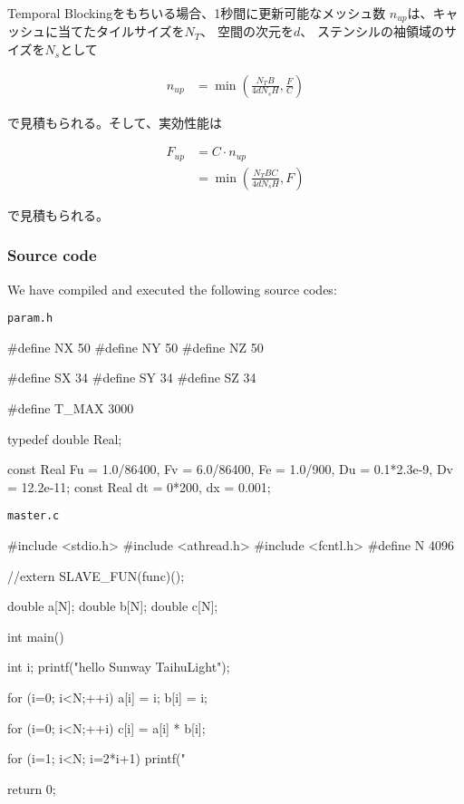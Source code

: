 Temporal Blockingをもちいる場合、1秒間に更新可能なメッシュ数
$n_{up}$は、キャッシュに当てたタイルサイズを$N_T$、
空間の次元を$d$、
ステンシルの袖領域のサイズを$N_s$として

\begin{align}
n_{up} &= \min \left( \frac{N_T B}{4dN_s H}, \frac{F}{C} \right)
\end{align}

で見積もられる。そして、実効性能は

\begin{align}
  F_{up} &= C \cdot n_{up} \\
  &= \min \left( \frac{N_T B C}{4 d N_s H}, F \right)
\end{align}

で見積もられる。




\subsubsection{Source code}
 We have compiled and executed the following source codes:

\verb`param.h`
\begin{code}
#define NX 50
#define NY 50
#define NZ 50

#define SX 34
#define SY 34
#define SZ 34

#define T_MAX 3000

typedef double Real;


const Real Fu = 1.0/86400, Fv = 6.0/86400, Fe = 1.0/900, Du = 0.1*2.3e-9, Dv = 12.2e-11;
const Real dt = 0*200, dx = 0.001;

\end{code}

\verb`master.c`
\begin{code}
#include <stdio.h>
#include <athread.h>
#include <fcntl.h>
#define N 4096


//extern SLAVE_FUN(func)();

double a[N];
double b[N];
double c[N];

int main() {
  int i;
  printf("hello Sunway TaihuLight\n");

  for (i=0; i<N;++i){
    a[i] = i;
    b[i] = i;
  }

  for (i=0; i<N;++i){
    c[i] = a[i] * b[i];
  }

  for (i=1; i<N; i=2*i+1){
    printf("%
  }

  return 0;
}

\end{code}

